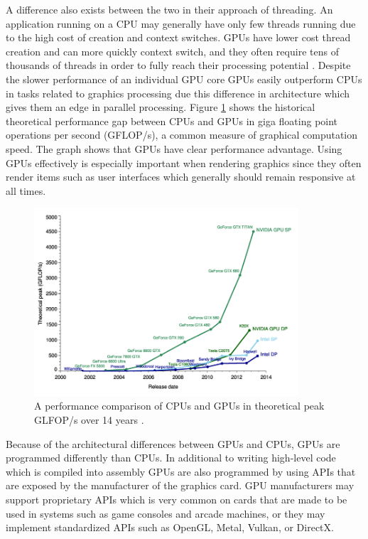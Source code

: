 \documentclass{article}
\begin{document}
A difference also exists between the two in their approach of threading. An application running on a CPU may generally have only few threads running due to the high cost of creation and context switches. GPUs have lower cost thread creation and can more quickly context switch, and they often require tens of thousands of threads in order to fully reach their processing potential \cite{larkin2016}. Despite the slower performance of an individual GPU core GPUs easily outperform CPUs in tasks related to graphics processing due this difference in architecture which gives them an edge in parallel processing. Figure \ref{fig:performance} shows the historical theoretical performance gap between CPUs and GPUs in giga floating point operations per second (GFLOP/s), a common measure of graphical computation speed. The graph shows that GPUs have clear performance advantage. Using GPUs effectively is especially important when rendering graphics since they often render items such as user interfaces which generally should remain responsive at all times.

\begin{figure}[h]
	\centering
	\includegraphics[height=7cm]{cpu-vs-gpu}
	\caption{A performance comparison of CPUs and GPUs in theoretical peak GLFOP/s over 14 years \cite{galloy2013}.}
	\label{fig:performance}
\end{figure}

Because of the architectural differences between GPUs and CPUs, GPUs are programmed differently than CPUs. In additional to writing high-level code which is compiled into assembly GPUs are also programmed by using APIs that are exposed by the manufacturer of the graphics card. GPU manufacturers may support proprietary APIs which is very common on cards that are made to be used in systems such as game consoles and arcade machines, or they may implement standardized APIs such as OpenGL, Metal, Vulkan, or DirectX.
\end{document}
